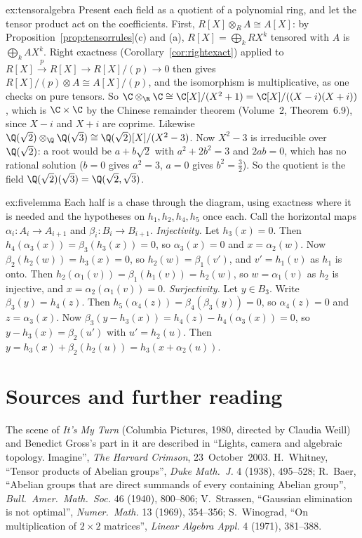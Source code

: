 \begin{solution}{ex:tensoralgebra}
\idea Present each field as a quotient of a polynomial ring, and let the tensor product act on the coefficients.
\writeup First, $R[X]\otimes_RA\cong A[X]$: by Proposition~\ref{prop:tensorrules}(c) and (a), $R[X]=\bigoplus_kRX^k$ tensored with $A$ is $\bigoplus_kAX^k$. Right exactness (Corollary~\ref{cor:rightexact}) applied to
$R[X]\xrightarrow{p}R[X]\to R[X]/(p)\to0$ then gives $R[X]/(p)\otimes A\cong A[X]/(p)$, and the isomorphism is multiplicative, as one checks on pure tensors. So $\C\otimes_{\R}\C\cong\C[X]/(X^2+1)=\C[X]/((X-i)(X+i))$, which is
$\C\times\C$ by the Chinese remainder theorem (Volume~2, Theorem~6.9), since $X-i$ and $X+i$ are coprime. Likewise $\Q(\sqrt2)\otimes_{\Q}\Q(\sqrt3)\cong\Q(\sqrt2)[X]/(X^2-3)$. Now $X^2-3$ is irreducible over $\Q(\sqrt2)$: a root would be
$a+b\sqrt2$ with $a^2+2b^2=3$ and $2ab=0$, which has no rational solution ($b=0$ gives $a^2=3$, $a=0$ gives $b^2=\frac32$). So the quotient is the field $\Q(\sqrt2)(\sqrt3)=\Q(\sqrt2,\sqrt3)$.
\end{solution}

\begin{solution}{ex:fivelemma}
\idea Each half is a chase through the diagram, using exactness where it is needed and the hypotheses on $h_1,h_2,h_4,h_5$ once each.
\writeup Call the horizontal maps $\alpha_i\colon A_i\to A_{i+1}$ and $\beta_i\colon B_i\to B_{i+1}$.
\emph{Injectivity.} Let $h_3(x)=0$. Then $h_4(\alpha_3(x))=\beta_3(h_3(x))=0$, so $\alpha_3(x)=0$ and $x=\alpha_2(w)$. Now $\beta_2(h_2(w))=h_3(x)=0$, so $h_2(w)=\beta_1(v')$, and $v'=h_1(v)$ as $h_1$ is onto. Then $h_2(\alpha_1(v))=\beta_1(h_1(v))=h_2(w)$, so
$w=\alpha_1(v)$ as $h_2$ is injective, and $x=\alpha_2(\alpha_1(v))=0$.
\emph{Surjectivity.} Let $y\in B_3$. Write $\beta_3(y)=h_4(z)$. Then $h_5(\alpha_4(z))=\beta_4(\beta_3(y))=0$, so $\alpha_4(z)=0$ and $z=\alpha_3(x)$. Now $\beta_3(y-h_3(x))=h_4(z)-h_4(\alpha_3(x))=0$, so $y-h_3(x)=\beta_2(u')$ with $u'=h_2(u)$. Then
$y=h_3(x)+\beta_2(h_2(u))=h_3(x+\alpha_2(u))$.
\end{solution}

\section*{Sources and further reading}

The scene of \emph{It's My Turn} (Columbia Pictures, 1980, directed by Claudia Weill) and Benedict Gross's part in it are described in ``Lights, camera and algebraic topology. Imagine'', \emph{The Harvard Crimson}, 23~October~2003.
H.~Whitney, ``Tensor products of Abelian groups'', \emph{Duke Math.\ J.} 4 (1938), 495--528; R.~Baer, ``Abelian groups that are direct summands of every containing Abelian group'', \emph{Bull.\ Amer.\ Math.\ Soc.} 46 (1940),
800--806; V.~Strassen, ``Gaussian elimination is not optimal'', \emph{Numer.\ Math.} 13 (1969), 354--356; S.~Winograd, ``On multiplication of $2\times2$ matrices'', \emph{Linear Algebra Appl.} 4 (1971), 381--388.

